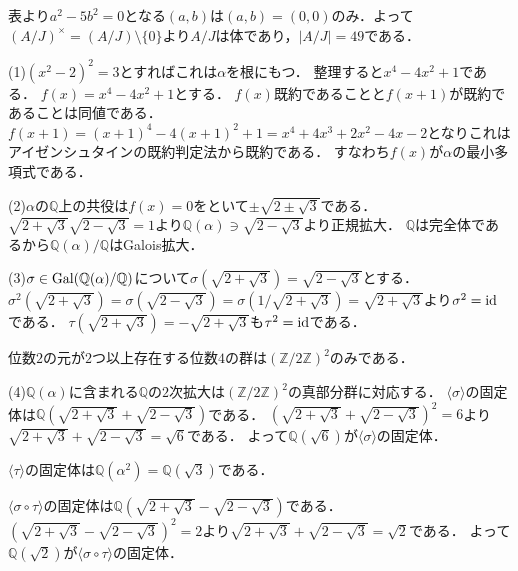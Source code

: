 \documentclass[
		book,
		head_space=20mm,
		foot_space=20mm,
		gutter=10mm,
		line_length=190mm
]{jlreq}
\begin{document}
表より$a^2-5b^2=0$となる$(a,b)$は$(a,b)=(0,0)$のみ．よって$(A/J)^\times=(A/J)\setminus\{ 0\}$より$A/J$は体であり，$|A/J|=49$である．

(1)$(x^2-2)^2=3$とすればこれは$\alpha$を根にもつ．
整理すると$x^4-4x^2+1$である．
$f(x)=x^4-4x^2+1$とする．
$f(x)$既約であることと$f(x+1)$が既約であることは同値である．
$f(x+1)=(x+1)^4-4(x+1)^2+1=x^4+4x^3+2x^2-4x-2$となりこれはアイゼンシュタインの既約判定法から既約である．
すなわち$f(x)$が$\alpha$の最小多項式である．

(2)$\alpha$の$\mathbb{Q}$上の共役は$f(x)=0$をといて$\pm \sqrt{2\pm\sqrt{3}}$である．
$\sqrt{2+\sqrt{3}}\sqrt{2-\sqrt{3}}=1$より$\mathbb{Q}(\alpha)\ni \sqrt{2-\sqrt{3}}$より正規拡大．
$\mathbb{Q}$は完全体であるから$\mathbb{Q}(\alpha)/\mathbb{Q}$はGalois拡大．

(3)$\sigma\in \mathop{\mathrm{Gal}}(\mathbb{Q}(\alpha)/\mathbb{Q})$について$\sigma(\sqrt{2+\sqrt{3}})=\sqrt{2-\sqrt{3}}$とする．
$\sigma^2(\sqrt{2+\sqrt{3}})=\sigma(\sqrt{2-\sqrt{3}})=\sigma(1/\sqrt{2+\sqrt{3}})=\sqrt{2+\sqrt{3}}$より$\sigma^2=\mathop{\mathrm{id}}$である．
$\tau(\sqrt{2+\sqrt{3}})=-\sqrt{2+\sqrt{3}}$も$\tau^2=\mathop{\mathrm{id}}$である．

位数$2$の元が$2$つ以上存在する位数$4$の群は$(\mathbb{Z}/2 \mathbb{Z})^2$のみである．

(4)$\mathbb{Q}(\alpha)$に含まれる$\mathbb{Q}$の$2$次拡大は$(\mathbb{Z}/2 \mathbb{Z})^2$の真部分群に対応する．
$\langle\sigma\rangle$の固定体は$\mathbb{Q}(\sqrt{2+\sqrt{3}}+\sqrt{2-\sqrt{3}})$である．
$(\sqrt{2+\sqrt{3}}+\sqrt{2-\sqrt{3}})^2=6$より$\sqrt{2+\sqrt{3}}+\sqrt{2-\sqrt{3}}=\sqrt{6}$である．
よって$\mathbb{Q}(\sqrt{6})$が$\langle\sigma\rangle$の固定体．

$\langle\tau\rangle$の固定体は$\mathbb{Q}(\alpha^2)=\mathbb{Q}(\sqrt{3})$である．

$\langle\sigma\circ\tau\rangle$の固定体は$\mathbb{Q}(\sqrt{2+\sqrt{3}}-\sqrt{2-\sqrt{3}})$である．
$(\sqrt{2+\sqrt{3}}-\sqrt{2-\sqrt{3}})^2=2$より$\sqrt{2+\sqrt{3}}+\sqrt{2-\sqrt{3}}=\sqrt{2}$である．
よって$\mathbb{Q}(\sqrt{2})$が$\langle\sigma\circ\tau\rangle$の固定体．
\end{document}
